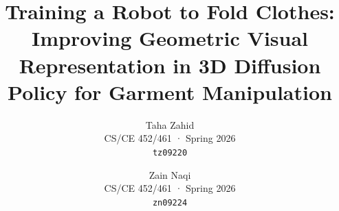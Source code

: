 \documentclass[10pt,twocolumn,letterpaper]{article}
\title{Training a Robot to Fold Clothes: Improving Geometric Visual Representation in 3D Diffusion Policy for Garment Manipulation}
\author{Taha Zahid\\
CS/CE 452/461 · Spring 2026\\
{\tt\small tz09220}
\and
Zain Naqi\\
CS/CE 452/461 · Spring 2026\\
{\tt\small zn09224}
}
\begin{document}
\maketitle








{
    \small
    
    
}
\end{document}
